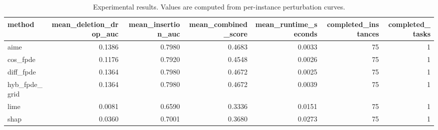 \begin{table}[t]
\caption{Experimental results. Values are computed from per-instance perturbation curves.}
\label{tab:main_results_computed}
\centering
\begin{tabular}{lrrrrrr}
\toprule
method & mean\_deletion\_drop\_auc & mean\_insertion\_auc & mean\_combined\_score & mean\_runtime\_seconds & completed\_instances & completed\_tasks \\
\midrule
aime & 0.1386 & 0.7980 & 0.4683 & 0.0033 & 75 & 1 \\
cos\_fpde & 0.1176 & 0.7920 & 0.4548 & 0.0026 & 75 & 1 \\
diff\_fpde & 0.1364 & 0.7980 & 0.4672 & 0.0025 & 75 & 1 \\
hyb\_fpde\_grid & 0.1364 & 0.7980 & 0.4672 & 0.0039 & 75 & 1 \\
lime & 0.0081 & 0.6590 & 0.3336 & 0.0151 & 75 & 1 \\
shap & 0.0360 & 0.7001 & 0.3680 & 0.0273 & 75 & 1 \\
\bottomrule
\end{tabular}

\end{table}
